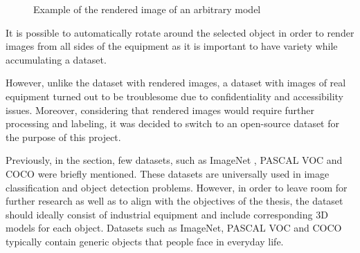 \documentclass[english, 12pt, a4paper, elec, utf8, a-1b, online]{aaltothesis}
\begin{document}
\begin{figure}[htb]
    \centering
    \qquad
    \caption{Example of the rendered image of an arbitrary model}\label{navisworks}%
\end{figure}
\FloatBarrier

It is possible to automatically rotate around the selected object in order to render images from all sides of the equipment as it is important to have variety while accumulating a dataset. 

However, unlike the dataset with rendered images, a dataset with images of real equipment turned out to be troublesome due to confidentiality and accessibility issues. Moreover, considering that rendered images would require further processing and labeling, it was decided to switch to an open-source dataset for the purpose of this project. 

Previously, in the  section, few datasets, such as ImageNet \cite{Russakovsky2014}, PASCAL VOC \cite{Everingham10} and COCO \cite{Lin2014} were briefly mentioned. These datasets are universally used in image classification and object detection problems. However, in order to leave room for further research as well as to align with the objectives of the thesis, the dataset should ideally consist of industrial equipment and include corresponding 3D models for each object. Datasets such as ImageNet, PASCAL VOC and COCO typically contain generic objects that people face in everyday life. 
\end{document}
